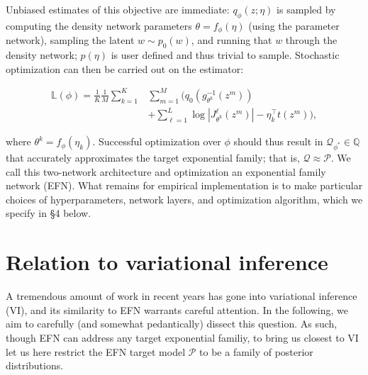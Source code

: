 \documentclass[twoside]{article}
\begin{document}
Unbiased estimates of this objective are immediate: $q_\phi(z;\eta)$ is sampled by computing the density network parameters $\theta = f_\phi(\eta)$ (using the parameter network), sampling the latent $w \sim p_0(w)$, and running that $w$ through the density network; $p(\eta)$ is user defined and thus trivial to sample.  Stochastic optimization can then be carried out on the estimator:   


{\small 
\begin{equation}
\begin{split}
 \mathbb{L}(\phi) = \frac{1}{K}\frac{1}{M}\sum_{k=1}^K & \sum_{m=1}^M \bigg( q_0\left( g_{\theta^k}^{-1}\left(z^m\right)\right) \\ & + \sum_{\ell=1}^L  \log | J^\ell_{\theta^k}\left(z^m\right) | - \eta_k^\top t\left(z^m\right) \bigg),
\end{split}
\label{eq:obj}
\end{equation} }

where $\theta^k = f_\phi\left(\eta_k\right)$.  Successful optimization over $\phi$ should thus result in $\mathcal{Q}_{\phi^*} \in \mathbb{Q}$ that accurately approximates the target exponential family; that is, $\mathcal{Q} \approx \mathcal{P}$.  We call this two-network architecture and optimization an exponential family network (EFN).   What remains for empirical implementation is to make particular choices of hyperparameters, network layers, and optimization algorithm, which we specify in \S4 below.

\section{Relation to variational inference}

A tremendous amount of work in recent years has gone into variational inference (VI), and its similarity to EFN warrants careful attention. 
In the following, we aim to carefully (and somewhat pedantically) dissect this question.  
As such, though EFN can address any target exponential familiy, to bring us closest to VI let us here restrict the EFN target model $\mathcal{P}$ to be a family of posterior distributions.  
\end{document}
